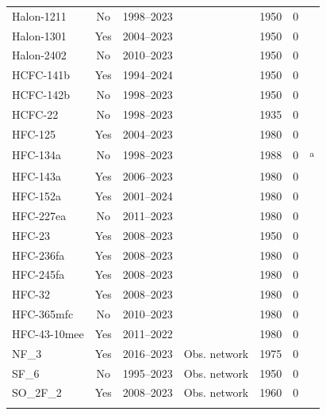\begin{tabular}{lcclcrl}
    Halon-1211 & No & 1998--2023 & \citet{wmo_ozone-ch7_2022} & 1950 & 0 & \citet{meinshausen_historical-ghgs_2017} \\
    Halon-1301 & Yes & 2004--2023 & \citet{wmo_ozone-ch7_2022} & 1950 & 0 & \citet{meinshausen_historical-ghgs_2017} \\
    Halon-2402 & No & 2010--2023 & \citet{wmo_ozone-ch7_2022} & 1950 & 0 & \citet{meinshausen_historical-ghgs_2017} \\
    HCFC-141b & Yes & 1994--2024 & \citet{western_hcfcs_2024} & 1950 & 0 & \citet{meinshausen_historical-ghgs_2017} \\
    HCFC-142b & No & 1998--2023 & \citet{western_hcfcs_2024} & 1950 & 0 & \citet{meinshausen_historical-ghgs_2017} \\
    HCFC-22 & No & 1998--2023 & \citet{western_hcfcs_2024} & 1935 & 0 & \citet{meinshausen_historical-ghgs_2017} \\
    HFC-125 & Yes & 2004--2023 & \citet{velders_hfcs_2022} & 1980 & 0 & \citet{velders_hfcs_2022} \\
    HFC-134a & No & 1998--2023 & \citet{velders_hfcs_2022} & 1988 & 0 & \citet{velders_hfcs_2022}\textsuperscript{a} \\
    HFC-143a & Yes & 2006--2023 & \citet{velders_hfcs_2022} & 1980 & 0 & \citet{velders_hfcs_2022} \\
    HFC-152a & Yes & 2001--2024 & \citet{velders_hfcs_2022} & 1980 & 0 & \citet{velders_hfcs_2022} \\
    HFC-227ea & No & 2011--2023 & \citet{velders_hfcs_2022} & 1980 & 0 & \citet{velders_hfcs_2022} \\
    HFC-23 & Yes & 2008--2023 & \citet{adam_hfc23_2024} & 1950 & 0 & \citet{meinshausen_historical-ghgs_2017} \\
    HFC-236fa & Yes & 2008--2023 & \citet{velders_hfcs_2022} & 1980 & 0 & \citet{velders_hfcs_2022} \\
    HFC-245fa & Yes & 2008--2023 & \citet{velders_hfcs_2022} & 1980 & 0 & \citet{velders_hfcs_2022} \\
    HFC-32 & Yes & 2008--2023 & \citet{velders_hfcs_2022} & 1980 & 0 & \citet{velders_hfcs_2022} \\
    HFC-365mfc & No & 2010--2023 & \citet{velders_hfcs_2022} & 1980 & 0 & \citet{velders_hfcs_2022} \\
    HFC-43-10mee & Yes & 2011--2022 & \citet{velders_hfcs_2022} & 1980 & 0 & \citet{velders_hfcs_2022} \\
    NF_3 & Yes & 2016--2023 & Obs. network & 1975 & 0 & \citet{meinshausen_historical-ghgs_2017} \\
    SF_6 & No & 1995--2023 & Obs. network & 1950 & 0 & \citet{meinshausen_historical-ghgs_2017} \\
    SO_2F_2 & Yes & 2008--2023 & Obs. network & 1960 & 0 & \citet{meinshausen_historical-ghgs_2017} \\
\bottomhline
\end{tabular}
